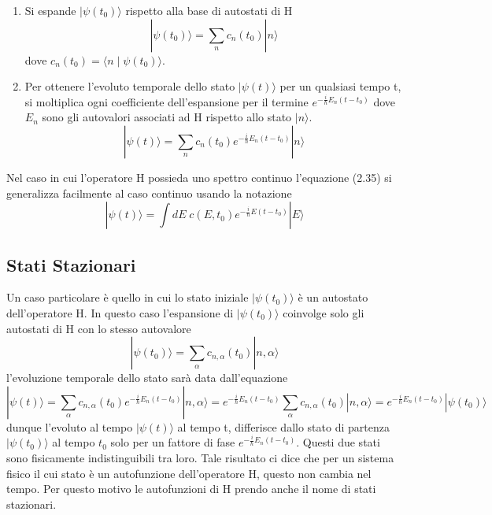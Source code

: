 \begin{enumerate}
	\item Si espande $|\psi(t_0)\rangle $ rispetto alla base di autostati di H
	\begin{equation*}
		|\psi(t_0) \rangle = \sum_{n} c_n(t_0)|n\rangle 
	\end{equation*}
	dove $c_n(t_0) = \langle n \mid \psi(t_0) \rangle $.
	\item Per ottenere l'evoluto temporale dello stato $|\psi(t) \rangle $ per un qualsiasi tempo t, si moltiplica ogni coefficiente dell'espansione per il termine $e^{-\frac{i}{\hbar}E_n (t-t_0)}$ dove $E_n$ sono gli autovalori associati ad H rispetto allo stato $|n \rangle $.
	\begin{equation}
		|\psi(t) \rangle = \sum_n c_n(t_0)e^{-\frac{i}{\hbar}E_n (t-t_0)}|n\rangle 
	\end{equation}
\end{enumerate} 

Nel caso in cui l'operatore H possieda uno spettro continuo l'equazione (2.35) si generalizza facilmente al caso continuo usando la notazione
\begin{equation}
	|\psi(t) \rangle = \int dE\; c(E,t_0)e^{-\frac{i}{\hbar}E (t-t_0)}|E \rangle 
\end{equation}
\newpage 

\subsection{Stati Stazionari}

Un caso particolare \`e quello in cui lo stato iniziale $|\psi(t_0)\rangle $ \`e un autostato dell'operatore H. In questo caso l'espansione di $|\psi(t_0) \rangle $ coinvolge solo gli autostati di H con lo stesso autovalore 
\begin{equation*}
	|\psi(t_0) \rangle = \sum_{\alpha} c_{n,\alpha}(t_0)|n,\alpha \rangle 
\end{equation*}
l'evoluzione temporale dello stato sar\`a data dall'equazione 
\begin{equation*}
	|\psi(t) \rangle = \sum_{\alpha} c_{n,\alpha}(t_0)e^{-\frac{i}{\hbar}E_n (t-t_0)}|n,\alpha \rangle = e^{-\frac{i}{\hbar}E_n (t-t_0)}\sum_{\alpha}c_{n,\alpha}(t_0)|n,\alpha \rangle = e^{-\frac{i}{\hbar}E_n (t-t_0)}|\psi(t_0)\rangle 
\end{equation*}
dunque l'evoluto al tempo $|\psi(t) \rangle $ al tempo t, differisce dallo stato di partenza $|\psi(t_0)\rangle $ al tempo $t_0$ solo per un fattore di fase $e^{-\frac{i}{\hbar}E_n (t-t_0)}$. Questi due stati sono fisicamente indistinguibili tra loro. Tale risultato ci dice che per un sistema fisico il cui stato \`e un autofunzione dell'operatore H, questo non cambia nel tempo. Per questo motivo le autofunzioni di H prendo anche il nome di stati stazionari. 

